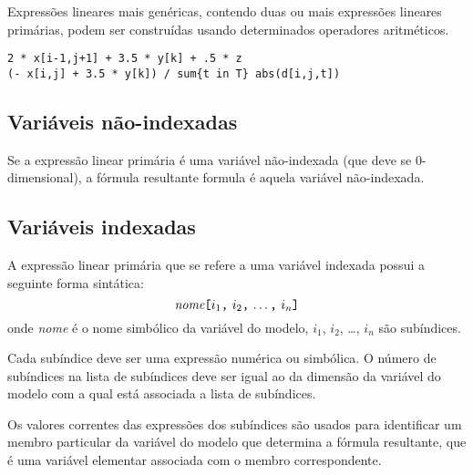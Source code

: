 \documentclass[11pt, brazil]{report}
\def\para#1{\noindent{\bf#1}}
\begin{document}
Expressões lineares mais genéricas, contendo duas ou mais
expressões lineares primárias, podem ser construídas usando
determinados operadores aritméticos.

\para{Exemplos}

%

\begin{verbatim}
2 * x[i-1,j+1] + 3.5 * y[k] + .5 * z
(- x[i,j] + 3.5 * y[k]) / sum{t in T} abs(d[i,j,t])
\end{verbatim}

\vspace*{-5pt}

\subsection{Variáveis não-indexadas}

Se a expressão linear primária é uma variável não-indexada (que deve
se 0-dimensional), a fórmula resultante formula é aquela variável
não-indexada.


\vspace*{-5pt}

\subsection{Variáveis indexadas}

A expressão linear primária que se refere a uma variável indexada possui
a seguinte forma sintática:
$$\mbox{{\it nome}{\tt[}$i_1${\tt,} $i_2${\tt,} \dots{\tt,}
$i_n${\tt]}}$$
onde {\it nome} é o nome simbólico da variável do modelo, $i_1$,
$i_2$, \dots, $i_n$ são subíndices.

Cada subíndice deve ser uma expressão numérica ou simbólica. O número
de subíndices na lista de subíndices deve ser igual ao da dimensão da
variável do modelo com a qual está associada a lista de subíndices.

Os valores correntes das expressões dos subíndices são usados para identificar
um membro \linebreak particular da variável do modelo que determina a fórmula resultante,
que é uma variável elementar associada com o membro correspondente.
\end{document}
